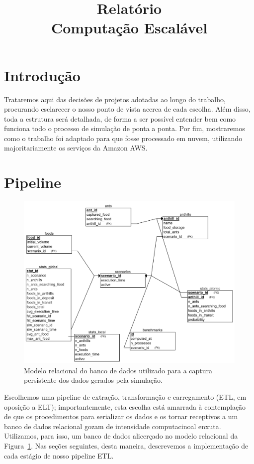\documentclass[12pt,oneside,a4paper]{article}
\title{Relatório\\Computação Escalável}
\begin{document}
\maketitle

\tableofcontents
\newpage


\section{Introdução}
    Trataremos aqui das decisões de projetos adotadas ao longo do trabalho, procurando esclarecer o nosso ponto de vista acerca de cada escolha. Além disso, toda a estrutura será detalhada, de forma a ser possível entender bem como funciona todo o processo de simulação de ponta a ponta. Por fim, mostraremos como o trabalho foi adaptado para que fosse processado em nuvem, utilizando majoritariamente os serviços da Amazon AWS.

\section{Pipeline}

	\begin{figure}[!ht]
		\centering 
		\includegraphics[width=\textwidth]{images/relational_diagram.png} 
		\caption{Modelo relacional do banco de dados utilizado para a captura persistente dos dados gerados pela simulação.} 
		\label{fig:relational} 
	\end{figure} 

	Escolhemos uma pipeline de extração, transformação e carregamento (ETL, em oposição a ELT); importantemente, esta escolha está amarrada à contemplação de que os procedimentos para serializar os dados e os tornar receptivos a um banco de dados relacional gozam de intensidade computacinoal enxuta. Utilizamos, para isso, um banco de dados alicerçado no modelo relacional da Figura~\ref{fig:relational}. Nas seções seguintes, desta maneira, descrevemos a implementação de cada estágio de nosso pipeline ETL. 
	
\end{document}
